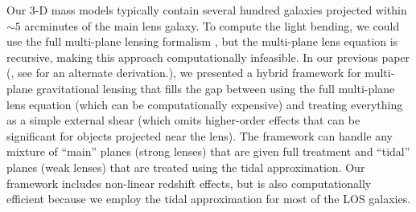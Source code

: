 Our 3-D mass models typically contain several hundred galaxies projected within $\sim 5$ arcminutes of the main lens galaxy. To compute the light bending, we could use the full multi-plane lensing formalism \citep{PLW}, but the multi-plane lens equation is recursive, making this approach computationally infeasible.
In our previous paper (\citealp{McCully14}, see \citealt{Schneider14} for an alternate derivation.), we presented a hybrid framework for multi-plane gravitational lensing that fills the gap between using the full multi-plane lens equation (which can be computationally expensive) and treating everything as a simple external shear (which omits higher-order effects that can be significant for objects projected near the lens). The framework can handle any mixture of ``main'' planes (strong lenses) that are given full treatment and ``tidal'' planes (weak lenses) that are treated using the tidal approximation. Our framework includes non-linear redshift effects, but is also computationally efficient because we employ the tidal approximation for most of the LOS galaxies.
  
  